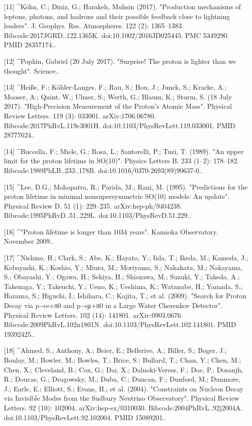 [11]
^Köhn, C.; Diniz, G.; Harakeh, Muhsin (2017). "Production mechanisms of leptons, photons, and hadrons and their possible feedback close to lightning leaders". J. Geophys. Res. Atmospheres. 122 (2): 1365–1383. Bibcode:2017JGRD..122.1365K. doi:10.1002/2016JD025445. PMC 5349290. PMID 28357174..

[12]
^Popkin, Gabriel (20 July 2017). "Surprise! The proton is lighter than we thought". Science..

[13]
^Heiße, F.; Köhler-Langes, F.; Rau, S.; Hou, J.; Junck, S.; Kracke, A.; Mooser, A.; Quint, W.; Ulmer, S.; Werth, G.; Blaum, K.; Sturm, S. (18 July 2017). "High-Precision Measurement of the Proton's Atomic Mass". Physical Review Letters. 119 (3): 033001. arXiv:1706.06780. Bibcode:2017PhRvL.119c3001H. doi:10.1103/PhysRevLett.119.033001. PMID 28777624..

[14]
^Buccella, F.; Miele, G.; Rosa, L.; Santorelli, P.; Tuzi, T. (1989). "An upper limit for the proton lifetime in SO(10)". Physics Letters B. 233 (1–2): 178–182. Bibcode:1989PhLB..233..178B. doi:10.1016/0370-2693(89)90637-0..

[15]
^Lee, D.G.; Mohapatra, R.; Parida, M.; Rani, M. (1995). "Predictions for the proton lifetime in minimal nonsupersymmetric SO(10) models: An update". Physical Review D. 51 (1): 229–235. arXiv:hep-ph/9404238. Bibcode:1995PhRvD..51..229L. doi:10.1103/PhysRevD.51.229..

[16]
^"Proton lifetime is longer than 1034 years". Kamioka Observatory. November 2009..

[17]
^Nishino, H.; Clark, S.; Abe, K.; Hayato, Y.; Iida, T.; Ikeda, M.; Kameda, J.; Kobayashi, K.; Koshio, Y.; Miura, M.; Moriyama, S.; Nakahata, M.; Nakayama, S.; Obayashi, Y.; Ogawa, H.; Sekiya, H.; Shiozawa, M.; Suzuki, Y.; Takeda, A.; Takenaga, Y.; Takeuchi, Y.; Ueno, K.; Ueshima, K.; Watanabe, H.; Yamada, S.; Hazama, S.; Higuchi, I.; Ishihara, C.; Kajita, T.; et al. (2009). "Search for Proton Decay via p→e+π0 and p→μ+π0 in a Large Water Cherenkov Detector". Physical Review Letters. 102 (14): 141801. arXiv:0903.0676. Bibcode:2009PhRvL.102n1801N. doi:10.1103/PhysRevLett.102.141801. PMID 19392425..

[18]
^Ahmed, S.; Anthony, A.; Beier, E.; Bellerive, A.; Biller, S.; Boger, J.; Boulay, M.; Bowler, M.; Bowles, T.; Brice, S.; Bullard, T.; Chan, Y.; Chen, M.; Chen, X.; Cleveland, B.; Cox, G.; Dai, X.; Dalnoki-Veress, F.; Doe, P.; Dosanjh, R.; Doucas, G.; Dragowsky, M.; Duba, C.; Duncan, F.; Dunford, M.; Dunmore, J.; Earle, E.; Elliott, S.; Evans, H.; et al. (2004). "Constraints on Nucleon Decay via Invisible Modes from the Sudbury Neutrino Observatory". Physical Review Letters. 92 (10): 102004. arXiv:hep-ex/0310030. Bibcode:2004PhRvL..92j2004A. doi:10.1103/PhysRevLett.92.102004. PMID 15089201..

